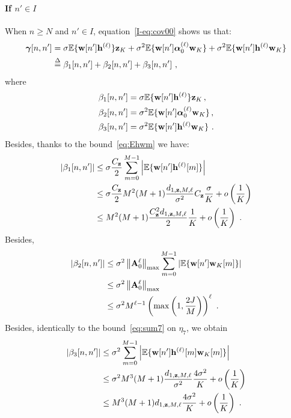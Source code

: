 \documentclass[journal,onecolumn]{IEEEtran}
\begin{document}
\paragraph{If $n'\in I$}
When $n\geq N$ and $n'\in I$, equation~\eqref{I-eq:cov00} shows us that:
\begin{align*}
\boldsymbol{\gamma}[n,n']&=\sigma{\mathbb E}\{{\mathbf w}[n']{\mathbf h}^{(\ell)}\}{\mathbf z}_K + \sigma^2{\mathbb E}\{{\mathbf w}[n']\boldsymbol{\alpha}_0^{(\ell)}{\mathbf w}_K\} + \sigma^2{\mathbb E}\{{\mathbf w}[n']{\mathbf h}^{(\ell)}{\mathbf w}_K\} \\
& \overset{\Delta}{=} \beta_1[n,n'] + \beta_2[n,n'] + \beta_3[n,n']\ ,
\end{align*}
where
\begin{align*}
\beta_1[n,n'] &= \sigma{\mathbb E}\{{\mathbf w}[n']{\mathbf h}^{(\ell)}\}{\mathbf z}_K\,, \\
\beta_2[n,n'] &= \sigma^2{\mathbb E}\{{\mathbf w}[n']\boldsymbol{\alpha}_0^{(\ell)}{\mathbf w}_K\}\,, \\
\beta_3[n,n'] &= \sigma^2{\mathbb E}\{{\mathbf w}[n']{\mathbf h}^{(\ell)}{\mathbf w}_K\}\ .
\end{align*}
Besides, thanks to the bound~\eqref{eq:Ehwm} we have:
\begin{align}
\nonumber
\left|\beta_1[n,n']\right| &\leq \sigma\dfrac{C_\bz}{2}\sum_{m=0}^{M-1}\left|\EE\{\bw[n']\bh^{(\ell)}[m]\}\right|\\
\nonumber
&\leq \sigma\dfrac{C_\bz}{2}M^2(M+1)\dfrac{d_{1,\bz,M,\ell}}{\sigma^2} C_\bz\dfrac{\sigma}{K} + o\left(\dfrac1K\right)\\
&\leq  M^2(M+1)\dfrac{C_\bz^2 d_{1,\bz,M,\ell}}{2}\dfrac{1}{K} + o\left(\dfrac1K\right)\ .
\label{eq:beta1}
\end{align}
Besides,
\begin{align}
\nonumber
\left|\beta_2[n,n']\right| &\leq \sigma^2\left\|\bA_0^{\ell}\right\|_{\max}\sum_{m=0}^{M-1}\left|\EE\{\bw[n']\bw_K[m]\}\right| \\
\nonumber
&\leq \sigma^2\left\|\bA_0^{\ell}\right\|_{\max} \\
&\leq \sigma^2M^{\ell-1}\left(\max\left(1,\frac{2J}{M}\right)\right)^{\ell}\ .
\label{eq:beta2}
\end{align}
Besides, identically to the bound~\eqref{eq:sum7} on $\eta_7$, we obtain 
\begin{align}
\nonumber
\left|\beta_3[n,n']\right| &\leq \sigma^2\sum_{m=0}^{M-1}\left|\EE\{\bw[n']\bh^{(\ell)}[m]\bw_K[m]\}\right|\\
\nonumber
&\leq \sigma^2 M^3(M+1)\dfrac{d_{1,\bz,M,\ell}}{\sigma^2} \dfrac{4\sigma^2}K + o\left(\dfrac1K\right) \\
&\leq M^3(M+1)d_{1,\bz,M,\ell} \dfrac{4\sigma^2}K + o\left(\dfrac1K\right) \ .
\label{eq:beta3}
\end{align}
\end{document}
